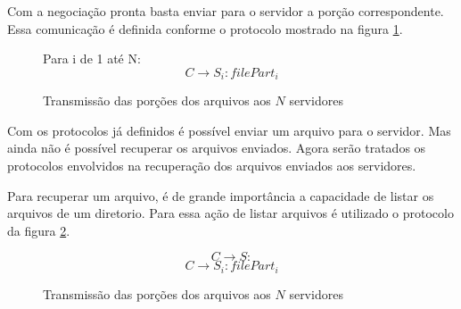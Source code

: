         Com a negociação pronta basta enviar para o servidor a porção correspondente. Essa comunicação é definida conforme o protocolo mostrado na figura \ref{fig:proSendFileData}.
        
        \begin{figure}
        Para i de 1 até N:
        \[ C \rightarrow S_{i}: filePart_{i} \]

        \caption{Transmissão das porções dos arquivos aos $N$ servidores}
        \label{fig:proSendFileData}
        \end{figure}
        
        
        Com os protocolos já definidos é possível enviar um arquivo para o servidor. Mas ainda não é possível recuperar os arquivos enviados. Agora serão tratados os protocolos envolvidos na recuperação dos arquivos enviados aos servidores.
        
        Para recuperar um arquivo, é de grande importância a capacidade de listar os arquivos de um diretorio. Para essa ação de listar arquivos é utilizado o protocolo da figura \ref{fig:proListFiles}.
        
        \begin{figure}
        \[ C \rightarrow S:  \]
        \[ C \rightarrow S_{i}: filePart_{i} \]

        \caption{Transmissão das porções dos arquivos aos $N$ servidores}
        \label{fig:proListFiles}
        \end{figure}
        
        
        
        
        
        
        
        
        
        
        
        
        
        